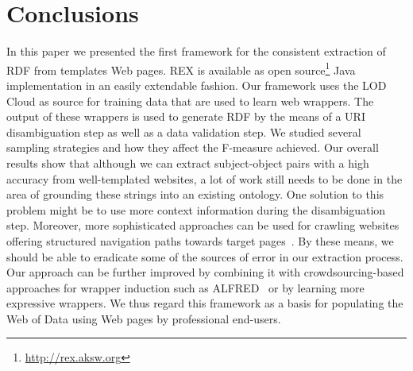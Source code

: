 \section{Conclusions}
\label{sec:conclusions}
In this paper we presented the first framework for the consistent extraction of RDF from templates Web pages. 
REX is available as open source\footnote{\url{http://rex.aksw.org}} Java implementation in an easily extendable fashion.
Our framework uses the LOD Cloud as source for training data that are used to learn web wrappers. 
The output of these wrappers is used to generate RDF by the means of a URI disambiguation step as well as a data validation step.
We studied several sampling strategies and how they affect the F-measure achieved.
Our overall results show that although we can extract subject-object pairs with a high accuracy from well-templated websites, a lot of work still needs to be done in the area of grounding these strings into an existing ontology.
One solution to this problem might be to use more context information during the disambiguation step.
Moreover, more sophisticated approaches can be used for crawling websites offering structured navigation paths towards target pages~\cite{DBLP:conf/webist/BlancoCM05}. 
By these means, we should be able to eradicate some of the sources of error in our extraction process. 
Our approach can be further improved by combining it with crowdsourcing-based approaches for wrapper induction such as ALFRED~\cite{Crescenzi2013} or by learning more expressive wrappers.
We thus regard this framework as a basis for populating the Web of Data using Web pages by professional end-users.

